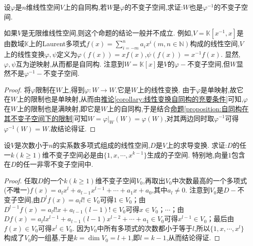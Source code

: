 \documentclass[../../main.tex]{subfiles}%
\begin{document}
\begin{proposition}\label{proposition:可逆线性变换的不变子空间仍是其逆的不变子空间}
设\(\varphi\)是\(n\)维线性空间\(V\)上的自同构,若\(W\)是\(\varphi\)的不变子空间,求证:\(W\)也是\(\varphi^{-1}\)的不变子空间.
\end{proposition}
\begin{remark}
如果\(V\)是无限维线性空间,则这个命题的结论一般并不成立. 例如,\(V = \mathbb{K}[x^{-1},x]\)是由数域\(\mathbb{K}\)上的Laurent多项式\(f(x)=\sum_{i = -m}^{n}a_ix^i(m,n\in\mathbb{N})\)构成的线性空间,\(V\)上的线性变换\(\varphi,\psi\)定义为\(\varphi(f(x)) = xf(x)\),\(\psi(f(x)) = x^{-1}f(x)\). 显然,\(\varphi,\psi\)互为逆映射,从而都是自同构. 注意到\(W = \mathbb{K}[x]\)是\(V\)的\(\varphi -\)不变子空间,但\(W\)显然不是\(\varphi^{-1}-\)不变子空间.
\end{remark}
\begin{proof}
将\(\varphi\)限制在\(W\)上,得到$\varphi :W\rightarrow W$.它是\(W\)上的线性变换. 由于\(\varphi\)是单映射,故它在\(W\)上的限制也是单映射,从而由\hyperref[corollary:线性变换自同构的充要条件]{推论\ref{corollary:线性变换自同构的充要条件}}可知,\(\varphi\)在\(W\)上的限制也是满映射,即它是\(W\)上的自同构,于是结合\hyperref[proposition:自同构在其不变子空间下的限制]{命题\ref{proposition:自同构在其不变子空间下的限制}}可知\(W=\varphi |_W\left( W \right) =\varphi \left( W \right) \),对其两边同时取$\varphi ^{-1}$可得$\varphi ^{-1}\left( W \right) =W$.故结论得证.
\end{proof}

\begin{example}
设\(V\)是次数小于\(n\)的实系数多项式组成的线性空间,\(D\)是\(V\)上的求导变换. 求证:\(D\)的任一\(k(k\geqslant  1)\)维不变子空间必是由\(\{1,x,\cdots,x^{k - 1}\}\)生成的子空间. 特别地,向量\(1\)包含在\(D\)的任一非零不变子空间中.
\end{example}
\begin{proof}
任取\(D\)的一个\(k(k\geqslant  1)\)维不变子空间\(V_0\),再取出\(V_0\)中次数最高的一个多项式(不唯一)\(f(x)=a_lx^l + a_{l - 1}x^{l - 1}+\cdots + a_1x + a_0\),其中\(a_l\neq 0\). 注意到\(V_0\)是\(D -\)不变子空间,由\(D^lf(x)=a_ll!\in V_0\)可得\(1\in V_0\)；由\(D^{l - 1}f(x)=a_ll!x + a_{l - 1}(l - 1)!\in V_0\)可得\(x\in V_0\)；\(\cdots\)；由\(Df(x)=a_llx^{l - 1}+a_{l - 1}(l - 1)x^{l - 2}+\cdots + a_1\in V_0\)可得\(x^{l - 1}\in V_0\)；最后由\(f(x)\in V_0\)可得\(x^l\in V_0\). 因为\(V_0\)中所有多项式的次数都小于等于\(l\),所以\(\{1,x,\cdots,x^l\}\)构成了\(V_0\)的一组基,于是\(k = \dim V_0 = l + 1\),即\(l = k - 1\),从而结论得证.
\end{proof}
\end{document}

